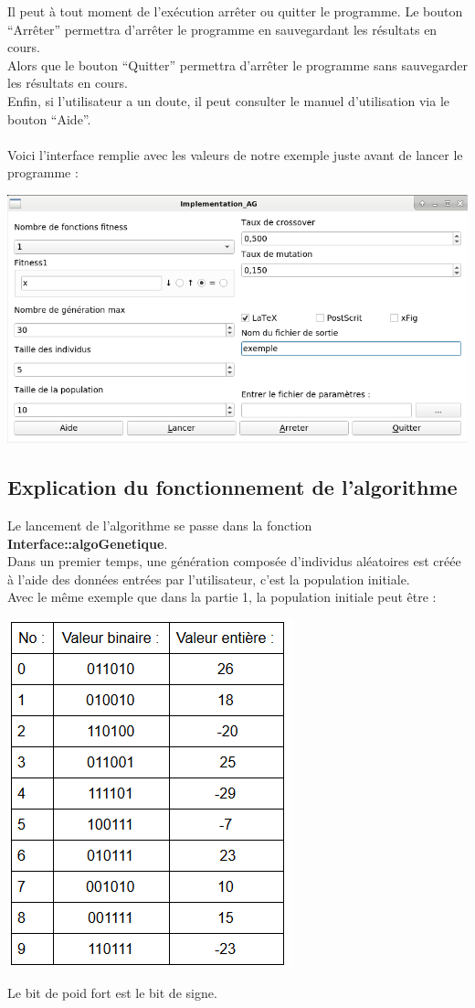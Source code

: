\documentclass[a4paper,11pt]{article}
\begin{document}
			Il peut à tout moment de l'exécution arrêter ou quitter le programme. Le bouton “Arrêter” permettra d’arrêter le programme en sauvegardant les résultats en cours.\\
			Alors que le bouton “Quitter” permettra d’arrêter le programme sans sauvegarder les résultats en cours.\\
			Enfin, si l’utilisateur a un doute, il peut consulter le manuel d’utilisation via le bouton “Aide”.\\\\
			Voici l’interface remplie avec les valeurs de notre exemple juste avant de lancer le programme :\\
			\centerline{\includegraphics[scale=0.5]{Interface.png}}
			
		\subsection{ Explication du fonctionnement de l’algorithme}
			Le lancement de l’algorithme se passe dans la fonction \textbf{Interface::algoGenetique}.\\
			Dans un premier temps, une génération composée d’individus aléatoires est créée à l’aide des données entrées par l’utilisateur, c’est la population initiale.\\
			Avec le même exemple que dans la partie 1, la population initiale peut être :\\
			\centerline{\includegraphics[scale=0.5]{ExemplePopulationInitiale.png}}
			Le bit de poid fort est le bit de signe.\\
			
\end{document}

